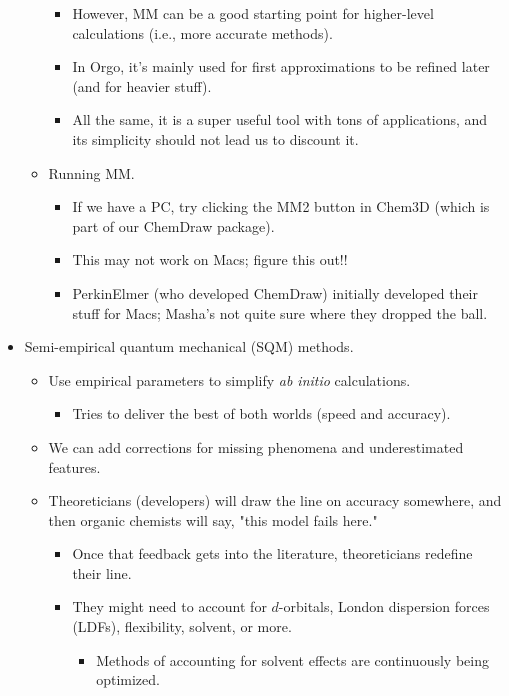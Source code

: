 \documentclass[../notes.tex]{subfiles}
\begin{document}
\begin{itemize}
\begin{itemize}
        \begin{itemize}
            \item However, MM can be a good starting point for higher-level calculations (i.e., more accurate methods).
            \item In Orgo, it's mainly used for first approximations to be refined later (and for heavier stuff).
            \item All the same, it is a super useful tool with tons of applications, and its simplicity should not lead us to discount it.
        \end{itemize}
        \item Running MM.
        \begin{itemize}
            \item If we have a PC, try clicking the MM2 button in Chem3D (which is part of our ChemDraw package).
            \item This may not work on Macs; figure this out!!
            \item PerkinElmer (who developed ChemDraw) initially developed their stuff for Macs; Masha's not quite sure where they dropped the ball.
        \end{itemize}
    \end{itemize}
    \item Semi-empirical quantum mechanical (SQM) methods.
    \begin{itemize}
        \item Use empirical parameters to simplify \emph{ab initio} calculations.
        \begin{itemize}
            \item Tries to deliver the best of both worlds (speed and accuracy).
        \end{itemize}
        \item We can add corrections for missing phenomena and underestimated features.
        \item Theoreticians (developers) will draw the line on accuracy somewhere, and then organic chemists will say, "this model fails here."
        \begin{itemize}
            \item Once that feedback gets into the literature, theoreticians redefine their line.
            \item They might need to account for $d$-orbitals, London dispersion forces (LDFs), flexibility, solvent, or more.
            \begin{itemize}
                \item Methods of accounting for solvent effects are continuously being optimized.

\end{itemize}
\end{itemize}
\end{itemize}
\end{itemize}
\end{document}
